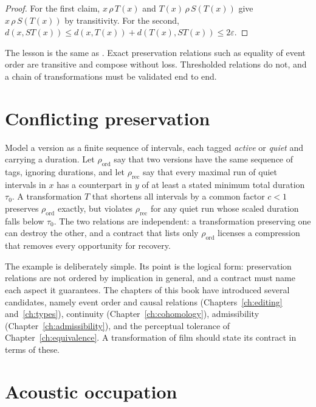 \begin{proof}
For the first claim, $x\,\rho\,T(x)$ and $T(x)\,\rho\,S(T(x))$ give $x\,\rho\,S(T(x))$ by transitivity. For the second, $d(x,ST(x))\le d(x,T(x))+d(T(x),ST(x))\le2\varepsilon$.
\end{proof}

The lesson is the same as . Exact preservation relations such as equality of event order are transitive and compose without loss. Thresholded relations do not, and a chain of transformations must be validated end to end.

\section{Conflicting preservation}\label{sec:conflict}

\begin{example}
Model a version as a finite sequence of intervals, each tagged \emph{active} or \emph{quiet} and carrying a duration. Let $\rho_{\mathrm{ord}}$ say that two versions have the same sequence of tags, ignoring durations, and let $\rho_{\mathrm{rec}}$ say that every maximal run of quiet intervals in $x$ has a counterpart in $y$ of at least a stated minimum total duration $\tau_0$. A transformation $T$ that shortens all intervals by a common factor $c<1$ preserves $\rho_{\mathrm{ord}}$ exactly, but violates $\rho_{\mathrm{rec}}$ for any quiet run whose scaled duration falls below $\tau_0$. The two relations are independent: a transformation preserving one can destroy the other, and a contract that lists only $\rho_{\mathrm{ord}}$ licenses a compression that removes every opportunity for recovery.
\end{example}

The example is deliberately simple. Its point is the logical form: preservation relations are not ordered by implication in general, and a contract must name each aspect it guarantees. The chapters of this book have introduced several candidates, namely event order and causal relations (Chapters~\ref{ch:editing} and~\ref{ch:types}), continuity (Chapter~\ref{ch:cohomology}), admissibility (Chapter~\ref{ch:admissibility}), and the perceptual tolerance of Chapter~\ref{ch:equivalence}. A transformation of film should state its contract in terms of these.

\section{Acoustic occupation}\label{sec:occupation}

